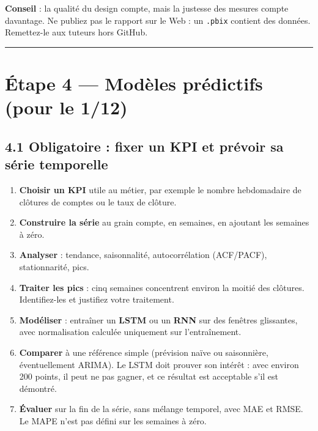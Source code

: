 \documentclass[11pt,a4paper]{article}
\renewenvironment{quote}{\begin{quotebox}}{\end{quotebox}}
\providecommand{\tightlist}{\setlength{\itemsep}{0pt}\setlength{\parskip}{0pt}}
\begin{document}
\begin{quote}
\textbf{Conseil} : la qualité du design compte, mais la justesse des
mesures compte davantage. Ne publiez pas le rapport sur le Web : un
\texttt{.pbix} contient des données. Remettez-le aux tuteurs hors
GitHub.
\end{quote}

\begin{center}\rule{0.5\linewidth}{0.5pt}\end{center}

\section{Étape 4 --- Modèles prédictifs (pour le
1/12)}\label{uxe9tape-4-moduxe8les-pruxe9dictifs-pour-le-112}

\subsection{4.1 Obligatoire : fixer un KPI et prévoir sa série
temporelle}\label{obligatoire-fixer-un-kpi-et-pruxe9voir-sa-suxe9rie-temporelle}

\begin{enumerate}
\def\labelenumi{\arabic{enumi}.}
\tightlist
\item
  \textbf{Choisir un KPI} utile au métier, par exemple le nombre
  hebdomadaire de clôtures de comptes ou le taux de clôture.
\item
  \textbf{Construire la série} au grain compte, en semaines, en ajoutant
  les semaines à zéro.
\item
  \textbf{Analyser} : tendance, saisonnalité, autocorrélation
  (ACF/PACF), stationnarité, pics.
\item
  \textbf{Traiter les pics} : cinq semaines concentrent environ la
  moitié des clôtures. Identifiez-les et justifiez votre traitement.
\item
  \textbf{Modéliser} : entraîner un \textbf{LSTM} ou un \textbf{RNN} sur
  des fenêtres glissantes, avec normalisation calculée uniquement sur
  l'entraînement.
\item
  \textbf{Comparer} à une référence simple (prévision naïve ou
  saisonnière, éventuellement ARIMA). Le LSTM doit prouver son intérêt :
  avec environ 200 points, il peut ne pas gagner, et ce résultat est
  acceptable s'il est démontré.
\item
  \textbf{Évaluer} sur la fin de la série, sans mélange temporel, avec
  MAE et RMSE. Le MAPE n'est pas défini sur les semaines à zéro.
\end{enumerate}
\end{document}
